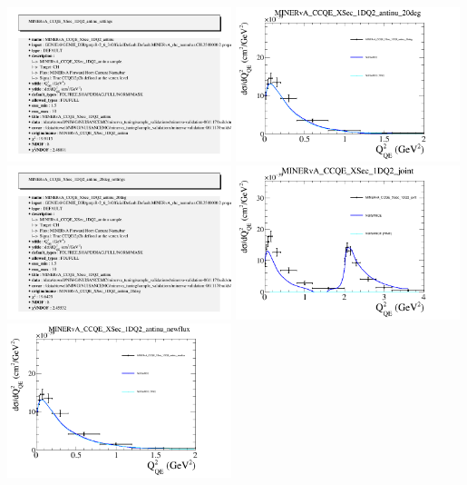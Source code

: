 \documentclass{article}
\begin{document}
\includegraphics[width=0.49\textwidth]{figures/nuisance_MINERvA_CCQE_XSec_1DQ2_antinu_info.png}
\centering
\includegraphics[width=0.49\textwidth]{figures/nuisance_MINERvA_CCQE_XSec_1DQ2_antinu_20deg_comp.png}
\includegraphics[width=0.49\textwidth]{figures/nuisance_MINERvA_CCQE_XSec_1DQ2_antinu_20deg_info.png}
\centering
\includegraphics[width=0.49\textwidth]{figures/nuisance_MINERvA_CCQE_XSec_1DQ2_joint_comp.png}
\\\centering
\includegraphics[width=0.49\textwidth]{figures/nuisance_MINERvA_CCQE_XSec_1DQ2_antinu_newflux_comp.png}
\end{document}
